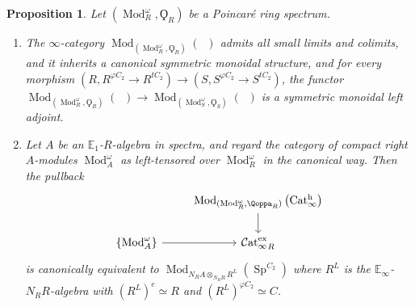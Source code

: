 \documentclass{article}
\DeclareMathOperator{\Cat}{\mathcal{C}at} %
\DeclareMathOperator{\Catex}{\Cat_\infty^{ex}} %
\DeclareMathOperator{\Cath}{Cat^h_\infty} %
\DeclareMathOperator{\Catpidem}{Cat^p_{\infty, idem}} %
\DeclareMathOperator{\Mod}{Mod} %
\DeclareMathOperator{\Spectra}{Sp} %
\newcommand{\EE}{\mathbb{E}}
\newtheorem{proposition}[equation]{Proposition}
\theoremstyle{definition}
\begin{document}
\begin{proposition}\label{prop:relative_poincare_cats_basic_properties}
    Let $ (\Mod_R^\omega, \Qoppa_R) $ be a Poincaré ring spectrum. 
    \begin{enumerate}[label=(\arabic*)]
        \item \label{propitem:Rlin_Poincare_cats_is_symm_mon} The $ \infty $-category $ \Mod_{\left(\Mod_R^\omega, \Qoppa_R \right)}(\Catpidem) $ admits all small limits and colimits, and it inherits a canonical symmetric monoidal structure, and for every morphism $ \left(R, R^{\varphi C_2} \to R^{tC_2}\right) \to (S, S^{\varphi C_2} \to S^{tC_2}) $, the functor $ \Mod_{\left(\Mod_R^\omega, \Qoppa_R \right)}(\Catpidem) \to \Mod_{\left(\Mod_S^\omega, \Qoppa_S \right)}(\Catpidem) $ is a symmetric monoidal left adjoint. 
        \item \label{propitem:classify_R_lin_hermitian_struct} Let $ A $ be an $ \EE_1 $-$ R $-algebra in spectra, and regard the category of compact right $ A $-modules $ \Mod_A^\omega $ as left-tensored over $ \Mod_R^\omega $ in the canonical way. 
        Then the pullback
        \begin{equation}
        \begin{tikzcd}
            & \Mod_{(\Mod_R^\omega, \Qoppa_R)}\left(\Cath\right) \ar[d] \\
            \{\Mod_A^\omega\} \ar[r] & \Catex_R
        \end{tikzcd}
        \end{equation}
        is canonically equivalent to $ \Mod_{N_R A \otimes_{N_R R} R^L }\left(\Spectra^{C_2}\right) $ where $ R^L $ is the $ \EE_\infty $-$ N_R R $-algebra with $ (R^L)^e \simeq R $ and $ (R^L)^{\varphi C_2}  \simeq C $. 


\end{enumerate}
\end{proposition}
\end{document}
